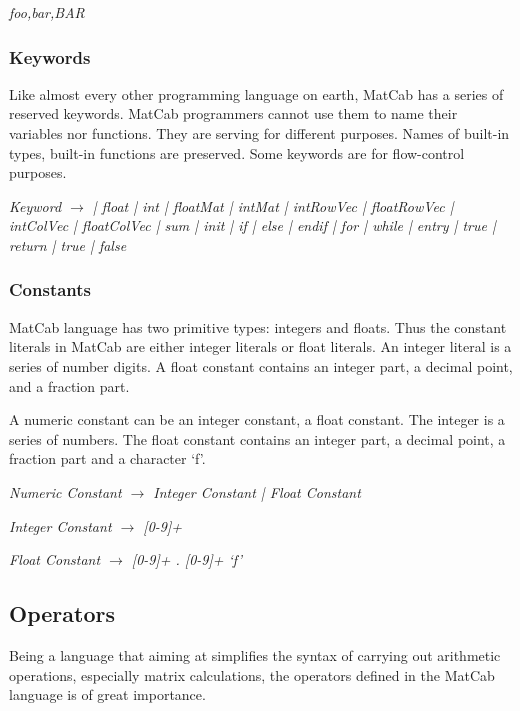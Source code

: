 \documentclass[12pt]{article} %
\begin{document}
\begin{center}
\emph{foo,bar,BAR}
\end{center}

\subsubsection{Keywords} 
Like almost every other programming language on earth, MatCab has a series of reserved keywords. MatCab programmers cannot use them to name their variables nor functions. They are serving for different purposes. Names of built-in types, built-in functions are preserved. Some keywords are for flow-control purposes.
\begin{center}
\emph {Keyword  \ensuremath{\rightarrow} 
   \big| float \big| int    \big| floatMat \big| intMat
  \big| intRowVec \big| floatRowVec   \big| intColVec \big| floatColVec  
  \big| sum \big| init  
       \big| if \big| else \big| endif \big| for \big| while \big| entry 
       \big| true \big| return \big| true \big| false 
}
\end{center}

\subsubsection{Constants} 
MatCab language has two primitive types: integers and floats. Thus the constant literals in MatCab are either integer literals or float literals. An integer literal is a series of number digits. A float constant contains an integer part, a decimal point, and a fraction part.

A numeric constant can be an integer constant, a float constant.
The integer is a series of numbers. The float constant contains an integer part, a decimal point, a fraction part and a character `f'.

\begin{center}
\emph {Numeric Constant \ensuremath{\rightarrow} Integer Constant \big| Float Constant}

\emph {Integer Constant \ensuremath{\rightarrow} {[}0-9{]}+}

\emph {Float Constant \ensuremath{\rightarrow} {[}0-9{]}+ . {[}0-9{]}+ `f'}
\end{center}


\subsection{Operators} 
Being a language that aiming at simplifies the syntax of carrying out arithmetic operations, especially matrix calculations, the operators defined in the MatCab language is of great importance.
\end{document}
